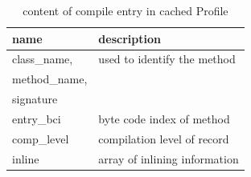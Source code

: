 \begin{table}[ht!]
  \caption{content of compile entry in cached Profile}
  \label{t:compile}
  \begin{center}
    \begin{tabular}{|p{5cm}|p{10.5cm}|} 
      \hline
       \textbf{name} & \textbf{description} \\ \hline\hline
       class\_name,& used to identify the method\\
       method\_name, & \\
       signature &\\ \hline
       entry\_bci & byte code index of method\\ \hline
       comp\_level & compilation level of record\\ \hline
       inline & array of inlining information\\ \hline        
    \end{tabular}
  \end{center}
\end{table} 
